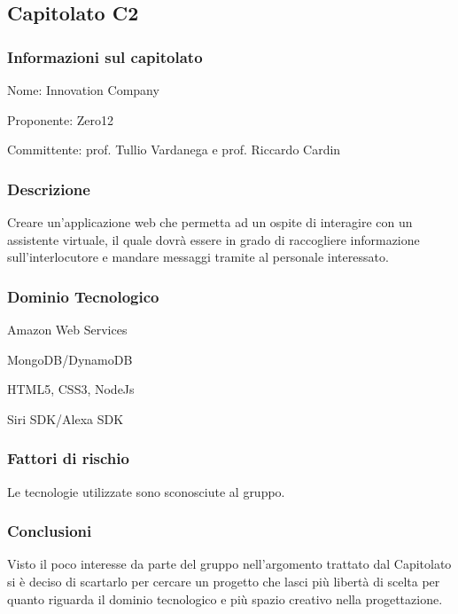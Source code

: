 \subsection{Capitolato C2}

\subsubsection{Informazioni sul capitolato}
\begin{trivlist}
	\setlength{\itemindent}{+.3in}
	\item  Nome: Innovation Company
	\item  Proponente: Zero12
	\item  Committente: prof. Tullio Vardanega e prof. Riccardo Cardin
\end{trivlist}

\subsubsection{Descrizione}

Creare un'applicazione web che permetta ad un ospite di interagire con un assistente virtuale, il quale dovrà essere in grado di raccogliere informazione sull'interlocutore e mandare messaggi tramite  al personale interessato.

\subsubsection{Dominio Tecnologico}
\begin{trivlist}
	\item Amazon Web Services
	\item MongoDB/DynamoDB
	\item HTML5, CSS3, NodeJs
	\item Siri SDK/Alexa SDK
\end{trivlist}


\subsubsection{Fattori di rischio}
Le tecnologie utilizzate sono sconosciute al gruppo.

\subsubsection{Conclusioni}

Visto il poco interesse da parte del gruppo nell'argomento trattato dal Capitolato si è deciso di scartarlo per cercare un progetto che lasci più libertà di scelta per quanto riguarda il dominio tecnologico e più spazio creativo nella progettazione.

